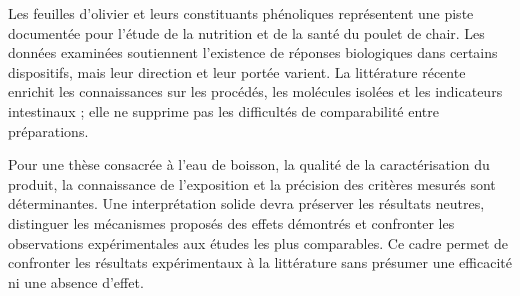 Les feuilles d'olivier et leurs constituants phénoliques représentent une piste documentée pour l'étude de la nutrition et de la santé du poulet de chair. Les données examinées soutiennent l'existence de réponses biologiques dans certains dispositifs, mais leur direction et leur portée varient. La littérature récente enrichit les connaissances sur les procédés, les molécules isolées et les indicateurs intestinaux ; elle ne supprime pas les difficultés de comparabilité entre préparations.

Pour une thèse consacrée à l'eau de boisson, la qualité de la caractérisation du produit, la connaissance de l'exposition et la précision des critères mesurés sont déterminantes. Une interprétation solide devra préserver les résultats neutres, distinguer les mécanismes proposés des effets démontrés et confronter les observations expérimentales aux études les plus comparables. Ce cadre permet de confronter les résultats expérimentaux à la littérature sans présumer une efficacité ni une absence d'effet.
